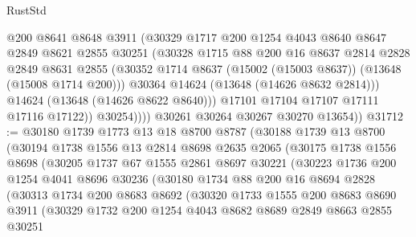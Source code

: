 \begin{lexlean}{RustStd}
\begin{coremodule}
                    @200
                    @8641
                    @8648
                    @3911
                    (@30329
                      @1717
                      @200
                      @1254
                      @4043
                      @8640
                      @8647
                      @2849
                      @8621
                      @2855
                      @30251
                      (@30328
                        @1715
                        @88
                        @200
                        @16
                        @8637
                        @2814
                        @2828
                        @2849
                        @8631
                        @2855
                        (@30352 @1714 @8637 (@15002 (@15003 @8637)) (@13648 (@15008 @1714 @200)))
                        @30364
                        @14624
                        (@13648 (@14626 @8632 @2814)))
                      @14624
                      (@13648 (@14626 @8622 @8640)))
                    @17101
                    @17104
                    @17107
                    @17111
                    @17116
                    @17122))
                @30254))))
        @30261
        @30264
        @30267
        @30270
        @13654))
@31712 := @30180
    @1739
    @1773
    @13
    @18
    @8700
    @8787
    (@30188
      @1739
      @13
      @8700
      (@30194
        @1738
        @1556
        @13
        @2814
        @8698
        @2635
        @2065
        (@30175
          @1738
          @1556
          @8698
          (@30205
            @1737
            @67
            @1555
            @2861
            @8697
            @30221
            (@30223
              @1736
              @200
              @1254
              @4041
              @8696
              @30236
              (@30180
                @1734
                @88
                @200
                @16
                @8694
                @2828
                (@30313
                  @1734
                  @200
                  @8683
                  @8692
                  (@30320
                    @1733
                    @1555
                    @200
                    @8683
                    @8690
                    @3911
                    (@30329
                      @1732
                      @200
                      @1254
                      @4043
                      @8682
                      @8689
                      @2849
                      @8663
                      @2855
                      @30251

\end{coremodule}
\end{lexlean}
